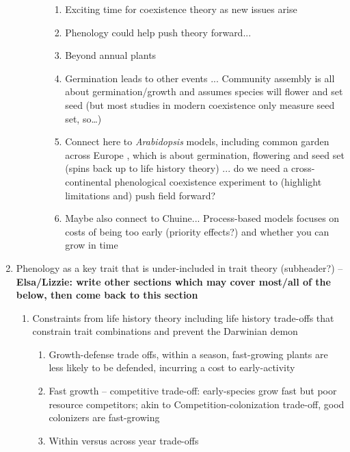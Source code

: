 \documentclass[11pt]{article}
\begin{document}
\begin{enumerate}
\begin{enumerate}
\begin{enumerate}
\begin{enumerate}
\item Exciting time for coexistence theory as new issues arise \citep{Barabas2018,song2019}
\item Phenology could help push theory forward...
\item Beyond annual plants 
\item Germination leads to other events ... Community assembly is all about germination/growth and assumes species will flower and set seed (but most studies in modern coexistence only measure seed set, so…)
\item Connect here to \emph{Arabidopsis} models, including common garden across Europe \citep{Stinchcombe:2004ec,arabid2011}, which is about germination, flowering and seed set (spins back up to life history theory) ... do we need a cross-continental phenological coexistence experiment to (highlight limitations and) push field forward? 
\item Maybe also connect to Chuine... Process-based models focuses on costs of being too early (priority effects?) and whether you can grow in time
\end{enumerate}
\end{enumerate}
\end{enumerate}
\item Phenology as a key trait that is under-included in trait theory (subheader?) -- {\bf Elsa/Lizzie: write other sections which may cover most/all of the below, then come back to this section} %
\begin{enumerate}
\item Constraints from life history theory including life history trade-offs that constrain trait combinations and prevent the Darwinian demon
\begin{enumerate}
\item Growth-defense trade offs, within a season, fast-growing plants are less likely to be defended, incurring a cost to early-activity \cite{waterton2016,meineke2019}
\item Fast growth – competitive trade-off: early-species grow fast but poor resource competitors; akin to Competition-colonization trade-off, good colonizers are fast-growing %
\item Within versus across year trade-offs \citep{silvertown1981,Wilczek:2009oa}

\end{enumerate}
\end{enumerate}
\end{enumerate}
\end{document}
